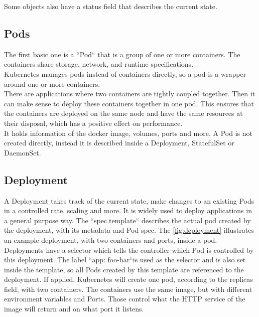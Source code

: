 Some objects also have a status field that describes the current state.~\cite{KUBERNETES-OBJECTS}

\subsection{Pods}
The first basic one is a ``Pod`` that is a group of one or more containers.
The containers share storage, network, and runtime specifications.
\\
Kubernetes manages pods instead of containers directly, so a pod is a wrapper around one or more containers.
\\
There are applications where two containers are tightly coupled together.
Then it can make sense to deploy these containers together in one pod.
This ensures that the containers are deployed on the same node and have the same resources at their disposal, which has a positive effect on performance.
\\
It holds information of the docker image, volumes, ports and more.
A Pod is not created directly, instead it is described inside a Deployment, StatefulSet or DaemonSet.~\cite{KUBERNETES-POD}

\subsection{Deployment}

A Deployment takes track of the current state, make changes to an existing Pods in a controlled rate, scaling and more.
It is widely used to deploy applications in a general purpose way.
The ``spec.template`` describes the actual pod created by the deployment, with its metadata and Pod spec.
The \autoref{fig:deployment} illustrates an example deployment, with two containers and ports, inside a pod.
Deployments have a selector which tells the controller which Pod is controlled by this deployment.
The label ``app: foo-bar``is used as the selector and is also set inside the template, so all Pods created by this template are referenced to the deployment.
If applied, Kubernetes will create one pod, according to the replicas field, with two containers.
The containers use the same image, but with different environment variables and Ports.
Those control what the HTTP service of the image will return and on what port it listens.~\cite{KUBERNETES-DEPLOYMENT}

